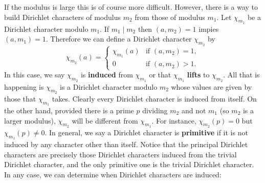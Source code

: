       If the modulus is large this is of course more difficult. However, there is a way to build Dirichlet characters of modulus $m_{2}$ from those of modulus $m_{1}$. Let $\chi_{m_{1}}$ be a Dirichlet character modulo $m_{1}$. If $m_{1} \mid m_{2}$ then $(a,m_{2}) = 1$ impies $(a,m_{1}) = 1$. Therefore we can define a Dirichlet character $\chi_{m_{2}}$ by
      \[
        \chi_{m_{2}}(a) = \begin{cases} \chi_{m_{1}}(a) & \text{if $(a,m_{2}) = 1$}, \\ 0 & \text{if $(a,m_{2}) > 1$}. \end{cases}
      \]
      In this case, we say $\chi_{m_{2}}$ is \textbf{induced} from $\chi_{m_{1}}$ or that $\chi_{m_{1}}$ \textbf{lifts} to $\chi_{m_{2}}$. All that is happening is $\chi_{m_{2}}$ is a Dirichlet character modulo $m_{2}$ whose values are given by those that $\chi_{m_{1}}$ takes. Clearly every Dirichlet character is induced from itself. On the other hand, provided there is a prime $p$ dividing $m_{2}$ and not $m_{1}$ (so $m_{2}$ is a larger modulus), $\chi_{m_{2}}$ will be different from $\chi_{m_{1}}$. For instance, $\chi_{m_{2}}(p) = 0$ but $\chi_{m_{1}}(p) \neq 0$. In general, we say a Dirichlet character is \textbf{primitive} if it is not induced by any character other than itself. Notice that the principal Dirichlet characters are precisely those Dirichlet characters induced from the trivial Dirichlet character, and the only primitive one is the trivial Dirichlet character. In any case, we can determine when Dirichlet characters are induced:


